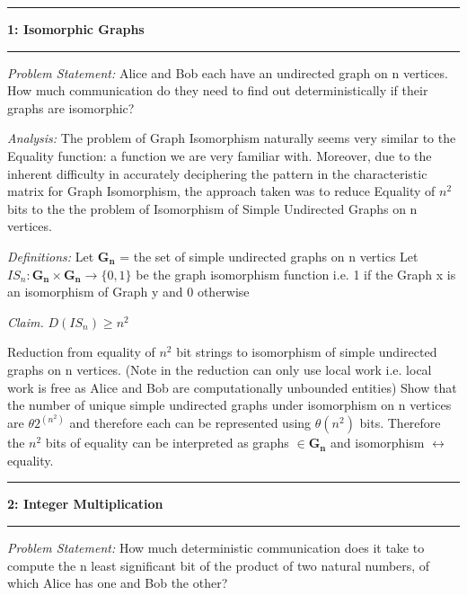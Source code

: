 \documentclass[11pt]{article}
\newcommand\question[2]{\vspace{.25in}\hrule\textbf{#1: #2}\vspace{.5em}\hrule\vspace{.10in}}
\newcommand\analysis{\vspace{.10in}\emph{Analysis: }\newline}
\newcommand\problem{\emph{Problem Statement:}\newline}
\newcommand\definitions{\emph{Definitions:}\newline}
\newcommand\claim{\emph{Claim.}\newline}
\begin{document}
\raggedright
\newcommand\NAME{Siddharth Joshi}  %
\newcommand\HWNUM{}              %


\question{1}{Isomorphic Graphs} 

\problem
Alice and Bob each have an undirected graph on n
vertices. How much communication do they need to find out deterministically if
their graphs are isomorphic?

\analysis
The problem of Graph Isomorphism naturally seems very similar to the Equality function: a function we are very familiar with. Moreover, due to the inherent difficulty in accurately deciphering the pattern in the characteristic matrix for Graph Isomorphism, the approach taken was to reduce Equality of $n^2$ bits to the the problem of Isomorphism of Simple Undirected Graphs on n vertices. \newline

\definitions
Let $\mathbf{G_n}$ = the set of simple undirected graphs on n vertics \newline
Let $IS_n: \mathbf{G_n} \times \mathbf{G_n} \to \{0, 1\}$ be the graph isomorphism function i.e. 1 if the Graph x is an isomorphism of Graph y and 0 otherwise
\newline

\claim
$ D(IS_n) \geq n^2 $

\proof 
Reduction from equality of $n^2$ bit strings to isomorphism of simple undirected graphs on n vertices. (Note in the reduction can only use local work i.e. local work is free as Alice and Bob are computationally unbounded entities) \newline
Show that the number of unique simple undirected graphs under isomorphism on n vertices are $\theta2^{(n^2)}$ and therefore each can be represented using $\theta(n^2)$ bits. Therefore the $n^2$ bits of equality can be interpreted as graphs $\in \mathbf{G_n}$ and isomorphism $\leftrightarrow$ equality.
\newpage

\question{2}{Integer Multiplication} 
\problem
How much deterministic communication does it take to compute the n
least significant bit of the product of two natural numbers, of which Alice has one and Bob the other?
\end{document}
